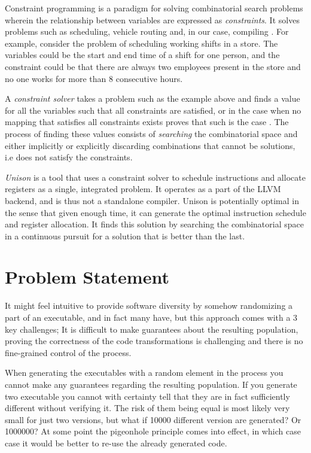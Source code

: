 Constraint programming is a paradigm for solving combinatorial search problems wherein
the relationship between variables are expressed as \textit{constraints}. It solves problems
such as scheduling, vehicle routing and, in our case, compiling
\cite{handbook-constraint-programming, unison-docs}. For example, consider the problem
of scheduling working shifts in a store. The variables could be the start and end time
of a shift for one person, and the constraint could be that there are always two employees
present in the store and no one works for more than 8 consecutive hours.

A \textit{constraint solver} takes a problem such as the example above and finds a value
for all the variables such that all constraints are satisfied, or in the case when no
mapping that satisfies all constraints exists proves that such is the case
\cite{handbook-constraint-programming}. The process of finding these values consists of
\textit{searching} the combinatorial space and either implicitly or explicitly discarding
combinations that cannot be solutions, i.e does not satisfy the constraints.

\textit{Unison} is a tool that uses a constraint solver to schedule instructions and allocate
registers as a single, integrated problem. It operates as a part of the LLVM backend, and
is thus not a standalone compiler. Unison is potentially optimal in the sense that given
enough time, it can generate the optimal instruction schedule and register allocation.
It finds this solution by searching the combinatorial space in a continuous pursuit for a
solution that is better than the last\cite{unison-docs}.

\section{Problem Statement}

It might feel intuitive to provide software diversity by somehow randomizing a part of an
executable, and in fact many have\cite{survey,librando,binary-stirring}, but this
approach comes with a 3 key challenges; It is difficult to make guarantees about the
resulting population, proving the correctness of the code transformations is challenging
and there is no fine-grained control of the process.

When generating the executables with a random element in the process you cannot make any
guarantees regarding the resulting population. If you generate two executable you cannot
with certainty tell that they are in fact sufficiently different without verifying it. The
risk of them being equal is most likely very small for just two versions, but what if
10000 different version are generated? Or 1000000? At some point the pigeonhole principle
comes into effect, in which case case it would be better to re-use the already generated
code.

